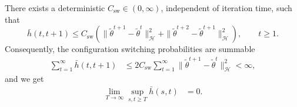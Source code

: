 \begin{proposition}
\label{prop:mean-field-configuration-switching}
There exists a deterministic $C_{\mathrm{sw}}\in(0,\infty)$,
independent of iteration time, such that
\begin{equation}
    \bar h(t,t+1)
    \leq C_{\mathrm{sw}}\left(
        \|\tilde\theta^{t+1}-\tilde\theta^t\|_{\mathcal H}^2
        +\|\tilde\theta^{t+2}-\tilde\theta^{t+1}\|_{\mathcal H}^2
    \right),\qquad t\geq1.
    \label{eq:effective-switching-control}
\end{equation}
Consequently, the configuration switching probabilities are summable
\begin{align}
    \sum_{t=1}^{\infty}\bar h(t,t+1)
    &\leq2C_{\mathrm{sw}}\sum_{t=1}^{\infty}
        \|\tilde\theta^{t+1}-\tilde\theta^t\|_{\mathcal H}^2
      <\infty,
    \label{eq:effective-switching-summability}
\end{align}
and we get
\begin{align}
    \lim_{T\to\infty}\sup_{s,t\geq T}\bar h(s,t)&=0.
    \label{eq:effective-configuration-cauchy}
\end{align}
\end{proposition}

